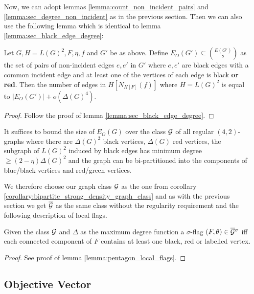 Now, we can adopt lemmas \ref{lemma:count_non_incident_pairs} and
\ref{lemma:sec_degree_non_incident} as in the previous section.
Then we can also use the following lemma which is identical to lemma
\ref{lemma:sec_black_edge_degree}:
\begin{lemma}
    Let $G, H=L(G)^2, F, \eta, f$ and $G'$ be as above.
    Define $E_O(G') \subseteq \binom{E(G')}{2}$ as the set of pairs of non-incident
    edges $e, e'$ in $G'$
    where $e, e'$ are black edges with a common incident edge and
    at least one of the vertices of each edge is black \textbf{or red}.
    Then the number of edges in $H[N_{H[F]}(f)]$
    where $H=L(G)^2$ is equal to $|E_O(G')| + o(\Delta(G)^4)$.
\end{lemma}
\begin{proof}
    Follow the proof of lemma \ref{lemma:sec_black_edge_degree}.
\end{proof}
\begin{corollary}
    \label{corollary:bipartite_strong_density_graph_class}
    It suffices to bound the size of $E_O(G)$
    over the class $\mathcal{G}$ of all regular $(4,2)$-graphs where there are $\Delta(G)^2$ black
    vertices, $\Delta(G)$ red vertices, the subgraph of $L(G)^2$ induced by
    black edges has minimum degree $\geq (2-\eta)\Delta(G)^2$ and the graph can be
    bi-partitioned into the components of blue/black vertices and red/green vertices.
\end{corollary}

We therefore choose our graph class $\mathcal{G}$ as the one from
corollary \ref{corollary:bipartite_strong_density_graph_class} and as with the
previous section we get $\overline{\mathcal{G}}$ as the same class without the regularity requirement
and the following description of local flags.

\begin{lemma}
    Given the class $\mathcal{G}$ and $\Delta$ as the maximum degree function a
    $\sigma$-flag $(F,\theta)\in\overline{\mathcal{G}}{}^\sigma$ iff each connected component
    of $F$ contains at least one black, red or labelled vertex.
\end{lemma}
\begin{proof}
    See proof of lemma \ref{lemma:pentagon_local_flags}.
\end{proof}

\subsection{Objective Vector}

